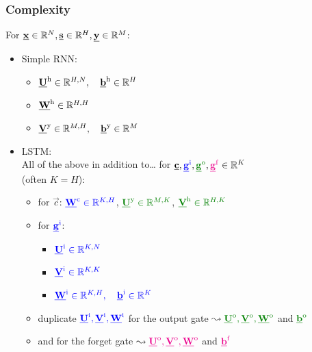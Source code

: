 \begin{frame}\frametitle{Complexity}
		For $\vec x \in \R^N, \vec s \in \R^H, \vec y \in \R^M$:\\
		\begin{itemize}
		\item[]
			Simple RNN:\\
			\begin{itemize}
			\item $\vec U^{\mathrm{h}} \in \R^{H,N},\quad \vec b^{\mathrm{h}} \in \R^{H}$
			\item $\vec W^{\mathrm{h}} \in \R^{H,H}$
			\item $\vec V^{\mathrm{y}} \in \R^{M,H},\quad \vec b^{\mathrm{y}} \in \R^{M}$
			\end{itemize}
			\pause
			
		\item[]
			LSTM:\\
			All of the above in addition to\ldots
			for $\vec c, {\color{blue}\vec g^{\mathrm{i}}}, {\color{darkgreen}\vec g^{\mathrm{o}}}, {\color{magenta}\vec g^{\mathrm{f}}} \in \R^K$\\
			(often $K=H$):\\
			\pause
			\begin{itemize}
			\item for $\vec c$:
             $\color{blue}\vec W^{\mathrm{c}} \in \R^{K,H}$, 
			 $\color{darkgreen}\vec U^{\mathrm{y}} \in \R^{M,K}$,
			 $\color{darkgreen}\vec V^{\mathrm{h}} \in \R^{H,K}$
			\item[] for ${\color{blue}\vec g^{\mathrm{i}}}$:
            \begin{itemize}
                \item $\color{blue}\vec U^{\mathrm{i}} \in \R^{K,N}$
                \item $\color{blue}\vec V^{\mathrm{i}} \in \R^{K,K}$
                \item $\color{blue}\vec W^{\mathrm{i}} \in \R^{K,H}, \quad \vec b^{\mathrm{i}} \in \R^{K}$
			\end{itemize}
            \item duplicate $\color{blue}\vec U^{\mathrm{i}}, \color{blue}\vec V^{\mathrm{i}}, \color{blue}\vec W^{\mathrm{i}}$
			for the output gate $\leadsto \color{darkgreen}\vec U^{\mathrm{o}}, \color{darkgreen}\vec V^{\mathrm{o}}, \color{darkgreen}\vec W^{\mathrm{o}}$ and $\color{darkgreen}\vec b^{\mathrm{o}}$
			\item and for the forget gate $\leadsto \color{magenta}\vec U^{\mathrm{o}}, \color{magenta}\vec V^{\mathrm{o}}, \color{magenta}\vec W^{\mathrm{o}}$ and $\color{magenta}\vec b^{\mathrm{f}}$
			\end{itemize}
		\end{itemize}
        
        \pause

\end{frame}
